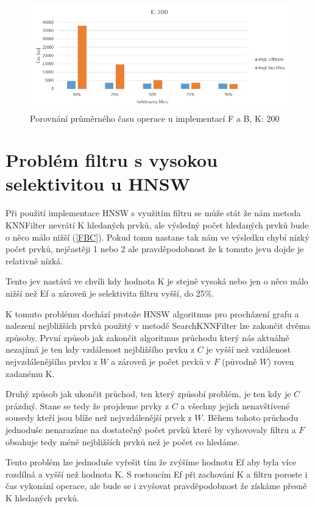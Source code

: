 \documentclass[czech,semestral,dept460,male,csharp,cpdeclaration]{diploma}
\begin{document}
		\begin{figure}
			\centering
			\includegraphics[scale=0.8]{Figures/graf_filtr_k200.png}
			\caption{Porovnání průměrného času operace u implementací F a B, K: 200}
			\label{graf_filtr_k200}
		\end{figure}
		
		\section{Problém filtru s vysokou selektivitou u HNSW}
		\label{FP}
		
			Při použití implementace HNSW s využitím filtru se může stát že nám metoda KNNFilter nevrátí K hledaných prvků, ale výsledný počet hledaných prvků bude o něco málo nižší (\ref{FBC}). Pokud tomu nastane tak nám ve výsledku chybí nízký počet prvků, nejčastěji 1 nebo 2 ale pravděpodobnost že k tomuto jevu dojde je relativně nízká.
			
			Tento jev nastává ve chvíli kdy hodnota K je stejně vysoká nebo jen o něco málo nižší než Ef a zároveň je selektivita filtru vyšší, do 25\%.
			
			K tomuto problému dochází protože HNSW algoritmus pro procházení grafu a nalezení nejbližších prvků použitý v metodě SearchKNNFilter lze zakončit dvěma způsoby. První způsob jak zakončit algoritmus průchodu který nás aktuálně nezajímá je ten kdy vzdálenost nejbližšího prvku z $C$ je vyšší než vzdálenost nejvzdálenějšího prvku z $W$ a zároveň je počet prvků v $F$ (původně $W$) roven zadanému K.
			
			Druhý způsob jak ukončit průchod, ten který způsobí problém, je ten kdy je $C$ prázdný. Stane se tedy že projdeme prvky z $C$ a všechny jejich nenavštívené sousedy kteří jsou blíže než nejvzdálenější prvek z $W$. Během tohoto průchodu jednoduše nenarazíme na dostatečný počet prvků které by vyhovovaly filtru a $F$ obsahuje tedy méně nejbližších prvků než je počet co hledáme.
			
			Tento problém lze jednoduše vyřešit tím že zvýšíme hodnotu Ef aby byla více rozdílná a vyšší než hodnota K. S rostoucím Ef při zachování K a filtru poroste i čas vykonání operace, ale bude se i zvyšovat pravděpodobnost že získáme přesně K hledaných prvků.
	
\end{document}
